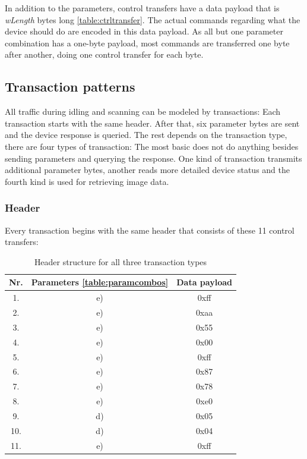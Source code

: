 \documentclass{article}
\begin{document}
In addition to the parameters, control transfers have a data payload that is {\it wLength} bytes long \autoref{table:ctrltransfer}.
The actual commands regarding what the device should do are encoded in this data payload.
As all but one parameter combination has a one-byte payload, most commands are transferred
one byte after another, doing one control transfer for each byte.

\subsection{Transaction patterns}
\label{ssec:transactionpatterns}

All traffic during idling and scanning can be modeled by transactions: Each transaction
starts with the same header. After that, six parameter bytes are sent and the
device response is queried. The rest depends on the transaction type, there
are four types of transaction: The most basic does not do anything besides sending parameters and querying the response.
One kind of transaction transmits additional parameter bytes, another reads more detailed device status
and the fourth kind is used for retrieving image data.

\subsubsection{Header}

Every transaction begins with the same header that consists of these 11 control transfers:

\begin{table}[H]
  \caption{Header structure for all three transaction types}
  \centering
  \begin{tabular}{c | c | c}
    Nr. & Parameters \autoref{table:paramcombos} & Data payload \\ \hline
    1. & e) & 0xff \\
    2. & e) & 0xaa \\
    3. & e) & 0x55 \\
    4. & e) & 0x00 \\
    5. & e) & 0xff \\
    6. & e) & 0x87 \\
    7. & e) & 0x78 \\
    8. & e) & 0xe0 \\
    9. & d) & 0x05 \\
    10. & d) & 0x04 \\
    11. & e) & 0xff \\
  \end{tabular}
  \label{table:transheader}
\end{table}
\end{document}
